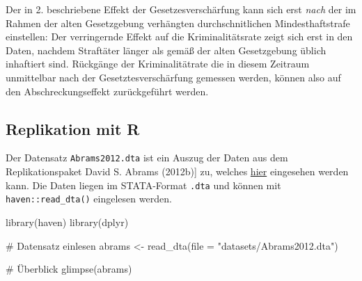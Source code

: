 \documentclass[
  a4paper,
  DIV=11,
  oneside]{scrreprt}
\newenvironment{Shaded}{\begin{snugshade}}{\end{snugshade}}
\newcommand{\AttributeTok}[1]{\textcolor[rgb]{0.40,0.45,0.13}{#1}}
\newcommand{\CommentTok}[1]{\textcolor[rgb]{0.37,0.37,0.37}{#1}}
\newcommand{\FunctionTok}[1]{\textcolor[rgb]{0.28,0.35,0.67}{#1}}
\newcommand{\NormalTok}[1]{\textcolor[rgb]{0.00,0.23,0.31}{#1}}
\newcommand{\OtherTok}[1]{\textcolor[rgb]{0.00,0.23,0.31}{#1}}
\newcommand{\StringTok}[1]{\textcolor[rgb]{0.13,0.47,0.30}{#1}}
\begin{document}
Der in 2. beschriebene Effekt der Gesetzesverschärfung kann sich erst
\emph{nach} der im Rahmen der alten Gesetzgebung verhängten
durchschnitlichen Mindesthaftstrafe einstellen: Der verringernde Effekt
auf die Kriminalitätsrate zeigt sich erst in den Daten, nachdem
Straftäter länger als gemäß der alten Gesetzgebung üblich inhaftiert
sind. Rückgänge der Kriminalitätrate die in diesem Zeitraum unmittelbar
nach der Gesetztesverschärfung gemessen werden, können also auf den
Abschreckungseffekt zurückgeführt werden.

\subsection{Replikation mit R}\label{replikation-mit-r}

Der Datensatz \texttt{Abrams2012.dta} ist ein Auszug der Daten aus dem
Replikationspaket David S. Abrams (2012b){]} zu, welches
\href{https://www.openicpsr.org/openicpsr/project/113838/version/V1/view}{hier}
eingesehen werden kann. Die Daten liegen im STATA-Format \texttt{.dta}
und können mit \texttt{haven::read\_dta()} eingelesen werden.

\begin{Shaded}
\begin{Highlighting}[]
\FunctionTok{library}\NormalTok{(haven)}
\FunctionTok{library}\NormalTok{(dplyr)}

\CommentTok{\# Datensatz einlesen}
\NormalTok{abrams }\OtherTok{\textless{}{-}} \FunctionTok{read\_dta}\NormalTok{(}\AttributeTok{file =} \StringTok{"datasets/Abrams2012.dta"}\NormalTok{)}

\CommentTok{\# Überblick}
\FunctionTok{glimpse}\NormalTok{(abrams)}
\end{Highlighting}
\end{Shaded}
\end{document}
